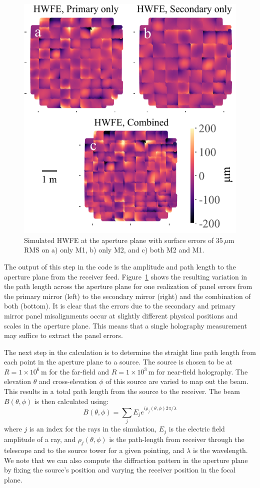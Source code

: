 \begin{figure}[t]
    \centering
    \includegraphics[width = .8\textwidth]{Figures/example_pathl_single_column2.pdf}
    \caption{Simulated HWFE at the aperture plane with surface errors of $35\,\mu$m RMS on a) only M1, b) only M2, and c) both M2 and M1.}
    \label{fig:pan_mod}
\end{figure}

The output of this step in the code is the amplitude and path length to the aperture plane from the receiver feed.  Figure~\ref{fig:pan_mod} shows the resulting variation in the path length across the aperture plane for one realization of panel errors from the primary mirror (left) to the secondary mirror (right) and the combination of both (bottom).  It is clear that the errors due to the secondary and primary mirror panel misalignments occur at slightly different physical positions and scales in the aperture plane.  This means that a single holography measurement may suffice to extract the panel errors. 

The next step in the calculation is to determine the straight line path length from each point in the aperture plane to a source.  The source is chosen to be at $R=1\times 10^6$\,m for the far-field and $R=1\times 10^3$\,m for near-field holography.  The elevation $\theta$ and cross-elevation $\phi$ of this source are varied to map out the beam.  This results in a total path length from the source to the receiver.  The beam $B(\theta,\phi)$ is then calculated using:
\begin{equation}
    B(\theta,\phi) = \sum_j E_j e^{i \rho_j(\theta,\phi) 2\pi/\lambda} 
\end{equation}
where $j$ is an index for the rays in the simulation, $E_j$ is the electric field amplitude of a ray, and $\rho_j(\theta,\phi)$ is the path-length from receiver through the telescope and to the source tower for a given pointing, and $\lambda$ is the wavelength.  We note that we can also compute the diffraction pattern in the aperture plane by fixing the source's position and varying the receiver position in the focal plane.  

